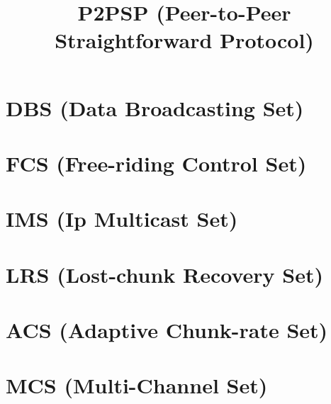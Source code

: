 \newcommand{\note}[1]{\color{red}\textbf{#1}}

\title{P2PSP (Peer-to-Peer Straightforward Protocol)}
\maketitle
\tableofcontents

\begin{abstract}

\end{abstract}

\section{DBS (Data Broadcasting Set)}
\label{sec:DBS}


\section{FCS (Free-riding Control Set)}
\label{sec:FCS}


\section{IMS (Ip Multicast Set)}
\label{sec:IMS}


\section{LRS (Lost-chunk Recovery Set)}
\label{sec:LRS}


\section{ACS (Adaptive Chunk-rate Set)}
\label{sec:ACS}


\section{MCS (Multi-Channel Set)}
\label{sec:MCS}



